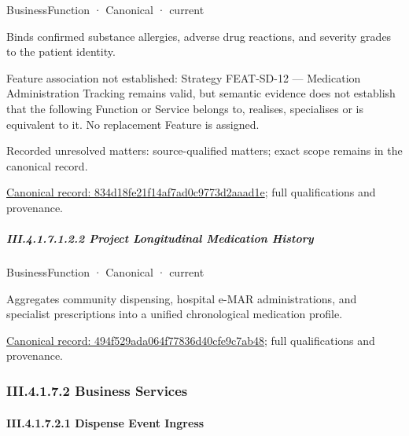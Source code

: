 \label{element:834d18fe21f14af7ad0c9773d2aaad1e}
{\small BusinessFunction · Canonical · current}\par

Binds confirmed substance allergies, adverse drug reactions, and severity grades to the patient identity.



Feature association not established: Strategy FEAT-SD-12 — Medication Administration Tracking remains valid, but semantic evidence does not establish that the following Function or Service belongs to, realises, specialises or is equivalent to it. No replacement Feature is assigned.


{\small Recorded unresolved matters: source-qualified matters; exact scope remains in the canonical record.}\par
{\footnotesize \href{../../../../../../../continuum/business/business-function/834d18fe21f14af7ad0c9773d2aaad1e.md}{Canonical record: 834d18fe21f14af7ad0c9773d2aaad1e}; full qualifications and provenance.}\par
\subparagraph*{III.4.1.7.1.2.2 Project Longitudinal Medication History}
\label{navigation:III.4.1.7.1.2.2}

\label{element:494f529ada064f77836d40cfe9c7ab48}
{\small BusinessFunction · Canonical · current}\par

Aggregates community dispensing, hospital e-MAR administrations, and specialist prescriptions into a unified chronological medication profile.


{\footnotesize \href{../../../../../../../continuum/business/business-function/494f529ada064f77836d40cfe9c7ab48.md}{Canonical record: 494f529ada064f77836d40cfe9c7ab48}; full qualifications and provenance.}\par
\subsubsection*{III.4.1.7.2 Business Services}
\label{navigation:III.4.1.7.2}

\paragraph*{III.4.1.7.2.1 Dispense Event Ingress}
\label{navigation:III.4.1.7.2.1}

